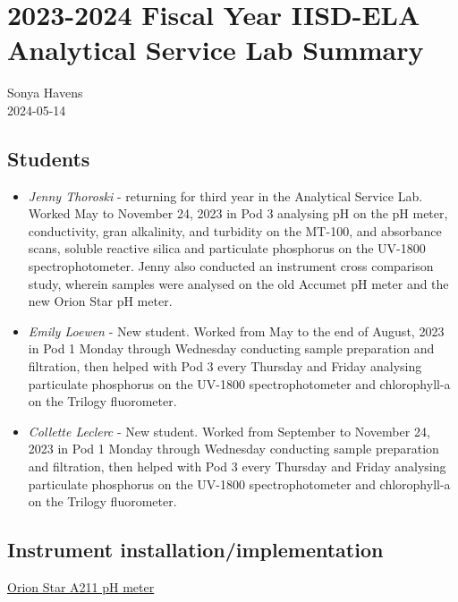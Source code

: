 \documentclass[
]{article}
\author{}
\date{\vspace{-2.5em}}
\begin{document}
\hypertarget{fiscal-year-iisd-ela-analytical-service-lab-summary}{%
\section{2023-2024 Fiscal Year IISD-ELA Analytical Service Lab
Summary}\label{fiscal-year-iisd-ela-analytical-service-lab-summary}}

Sonya Havens\\
2024-05-14

\hypertarget{students}{%
\subsection{Students}\label{students}}

\begin{itemize}
\item
  \emph{Jenny Thoroski} - returning for third year in the Analytical
  Service Lab. Worked May to November 24, 2023 in Pod 3 analysing pH on
  the pH meter, conductivity, gran alkalinity, and turbidity on the
  MT-100, and absorbance scans, soluble reactive silica and particulate
  phosphorus on the UV-1800 spectrophotometer. Jenny also conducted an
  instrument cross comparison study, wherein samples were analysed on
  the old Accumet pH meter and the new Orion Star pH meter.
\item
  \emph{Emily Loewen} - New student. Worked from May to the end of
  August, 2023 in Pod 1 Monday through Wednesday conducting sample
  preparation and filtration, then helped with Pod 3 every Thursday and
  Friday analysing particulate phosphorus on the UV-1800
  spectrophotometer and chlorophyll-a on the Trilogy fluorometer.
\item
  \emph{Collette Leclerc} - New student. Worked from September to
  November 24, 2023 in Pod 1 Monday through Wednesday conducting sample
  preparation and filtration, then helped with Pod 3 every Thursday and
  Friday analysing particulate phosphorus on the UV-1800
  spectrophotometer and chlorophyll-a on the Trilogy fluorometer.
\end{itemize}

\hypertarget{instrument-installationimplementation}{%
\subsection{Instrument
installation/implementation}\label{instrument-installationimplementation}}

\underline{Orion Star A211 pH meter}
\end{document}
